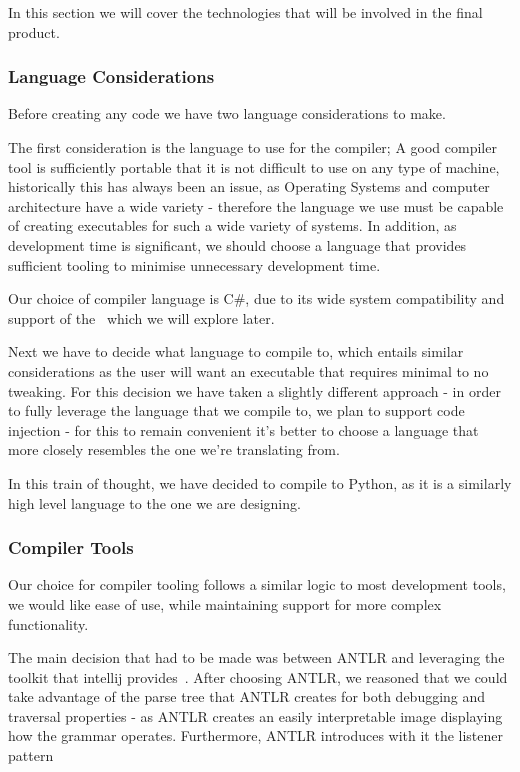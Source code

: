 In this section we will cover the technologies that will be involved in the final product.

\subsubsection{Language Considerations}
Before creating any code we have two language considerations to make.

The first consideration is the language to use for the compiler;
A good compiler tool is sufficiently portable that it is not difficult to use on any type of machine, historically this
has always been an issue, as Operating Systems and computer architecture have a wide variety - therefore the language
we use must be capable of creating executables for such a wide variety of systems.
In addition, as development time is significant, we should choose a language that provides sufficient tooling to
minimise unnecessary development time.

Our choice of compiler language is C\#, due to its wide system compatibility and support of the~\cite{ANTLR} which we
will explore later.

Next we have to decide what language to compile to, which entails similar considerations as the user will want an
executable that requires minimal to no tweaking.
For this decision we have taken a slightly different approach - in order to fully leverage the language that we compile
to, we plan to support code injection - for this to remain convenient it's better to choose a language that more closely
resembles the one we're translating from.

In this train of thought, we have decided to compile to Python, as it is a similarly high level language to the one
we are designing.

\subsubsection{Compiler Tools}\label{subsubsec:compilertools}
Our choice for compiler tooling follows a similar logic to most development tools, we would like ease of use, while
maintaining support for more complex functionality.

The main decision that had to be made was between ANTLR and leveraging the toolkit that intellij
provides~\cite{IntellijLanguage}.
After choosing ANTLR, we reasoned that we could take advantage of the parse tree that ANTLR creates for both debugging
and traversal properties - as ANTLR creates an easily interpretable image displaying how the grammar operates.
Furthermore, ANTLR introduces with it the listener pattern~\cite[p18]{ANTLRReference}

